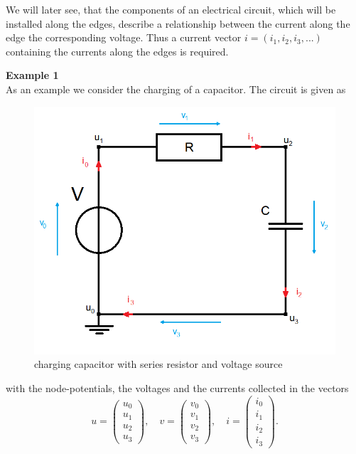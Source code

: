 We will later see, that the components of an electrical circuit, which will be installed along the edges, describe a relationship between the current along the edge the corresponding voltage. Thus a current vector $i = (i_1, i_2, i_3, ...)$ containing the currents along the edges is required.


\textbf{Example 1} \label{ex:network topology} \\
As an example we consider the charging of a capacitor. The circuit is given as
\begin{figure}[H]
	\label{circuit:charging of capacitor}
	\centering
	\includegraphics[scale=0.5]{pictures/Example1_simple.png}
	\caption{charging capacitor with series resistor and voltage source}
\end{figure}
with the node-potentials, the voltages and the currents collected in the vectors
\begin{displaymath}
	u=
	\left(
	\begin{matrix}
		u_0 \\
		u_1 \\
		u_2 \\
		u_3 
	\end{matrix}
	\right),
	\quad
	v=
	\left(
	\begin{matrix}
		v_0 \\
		v_1 \\
		v_2 \\
		v_3 
	\end{matrix}
	\right),
	\quad
	i=
	\left(
	\begin{matrix}
		i_0 \\
		i_1 \\
		i_2 \\
		i_3 
	\end{matrix}
	\right).
\end{displaymath}
